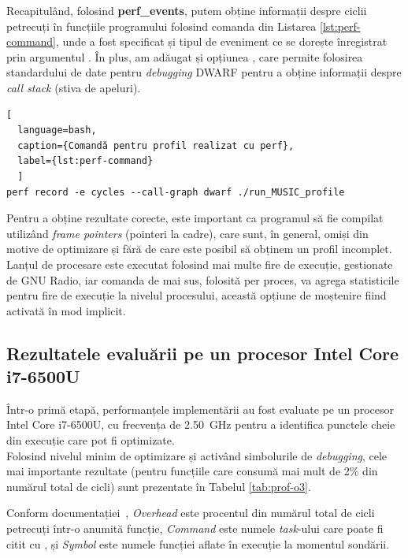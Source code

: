 Recapitulând, folosind \textbf{perf\_events}, putem obține informații despre
ciclii petrecuți în funcțiile programului folosind comanda din Listarea
\ref{lst:perf-command}, unde a fost specificat și tipul de eveniment ce se
dorește înregistrat prin argumentul . În plus, am adăugat și
opțiunea , care permite folosirea standardului de date
pentru \textit{debugging} DWARF pentru a obține informații despre \textit{call
stack} (stiva de apeluri).

\begin{lstlisting}[
  language=bash,
  caption={Comandă pentru profil realizat cu perf},
  label={lst:perf-command}
  ]
perf record -e cycles --call-graph dwarf ./run_MUSIC_profile

\end{lstlisting}

Pentru a obține rezultate corecte, este important ca programul să fie compilat
utilizând \textit{frame pointers} (pointeri la cadre), care sunt, în general,
omiși din motive de optimizare și fără de care este posibil să obținem un profil
incomplet. \\

Lanțul de procesare este executat folosind mai multe fire de execuție,
gestionate de GNU Radio, iar comanda de mai sus, folosită per proces, va agrega
statisticile pentru fire de execuție la nivelul procesului, această opțiune de
moștenire fiind activată în mod implicit.

\subsection{Rezultatele evaluării pe un procesor Intel Core i7-6500U}

Într-o primă etapă, performanțele implementării  au fost evaluate
pe un procesor Intel Core i7-6500U, cu frecvența de \SI{2,50}{GHz} pentru a
identifica punctele cheie din execuție care pot fi optimizate. \\

Folosind nivelul minim de optimizare și activând simbolurile de
\textit{debugging}, cele mai importante rezultate (pentru funcțiile care consumă
mai mult de 2\% din numărul total de cicli) sunt prezentate în Tabelul
\ref{tab:prof-o3}.



Conform documentației~\cite{perf-doc}, \textit{Overhead} este procentul din
numărul total de cicli petrecuți într-o anumită funcție, \textit{Command} este
numele \textit{task}-ului care poate fi citit cu , și
\textit{Symbol} este numele funcției aflate în execuție la momentul sondării. \\

